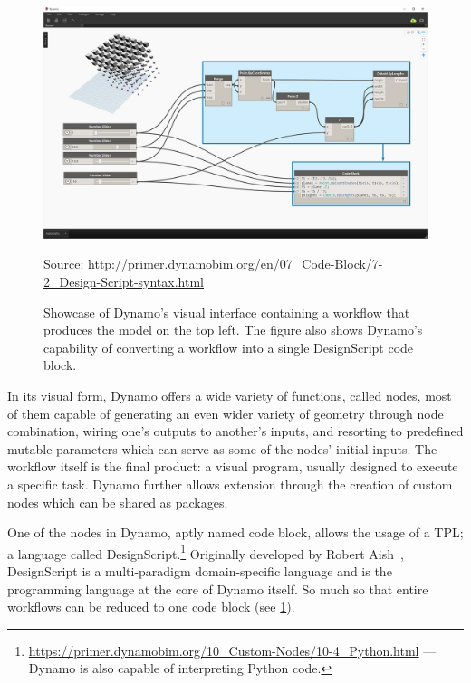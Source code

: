 \begin{figure}[htb]
  \includegraphics[width=\linewidth]{fig/dynamo-node-to-code}
  \begin{minipage}{\linewidth}
  \scriptsize Source:
  \url{http://primer.dynamobim.org/en/07_Code-Block/7-2_Design-Script-syntax.html}
  \end{minipage}
  \caption[Dynamo's visual interface with node to code translation]{
    Showcase of Dynamo's visual interface containing a workflow that produces
    the model on the top left.  The figure also shows Dynamo's capability of
    converting a workflow into a single DesignScript code block.}%
  \label{fig:related.ad.dynamo.node2code}
\end{figure}

In its visual form, Dynamo offers a wide variety of functions, called nodes,
most of them capable of generating an even wider variety of geometry through
node combination, wiring one's outputs to another's inputs, and resorting to
predefined mutable parameters which can serve as some of the nodes' initial
inputs.  The workflow itself is the final product: a visual program, usually
designed to execute a specific task.  Dynamo further allows extension through the
creation of custom nodes which can be shared as packages.

One of the nodes in Dynamo, aptly named code block, allows the usage of a
\ac{TPL}; a language called
DesignScript.\footnote{\url{https://primer.dynamobim.org/10_Custom-Nodes/10-4_Python.html}
--- Dynamo is also capable of interpreting Python code.}
Originally developed by Robert Aish~\cite{Aish:2011:DesignScript}, DesignScript
is a multi-paradigm domain-specific language and is the programming language at
the core of Dynamo itself.  So much so that entire workflows can be reduced to
one code block (see \cref{fig:related.ad.dynamo.node2code}).


